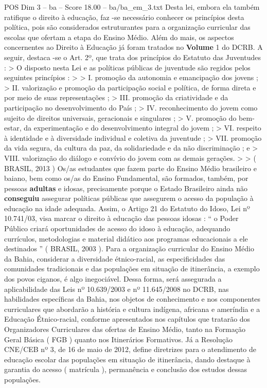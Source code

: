 \begin{textsample}{POS Dim 3 – ba – Score 18.00 – ba/ba\_em\_3.txt}
Desta lei, embora ela também ratifique o direito à educação, faz -se necessário conhecer os princípios desta política, pois são considerados estruturantes para a organização curricular das escolas que ofertam a etapa do Ensino Médio.
Além do mais, os aspectos concernentes ao Direito à Educação já foram tratados no \textbf{Volume} 1 do DCRB.
A seguir, destaca -se o Art. 2º, que trata dos princípios do Estatuto das Juventudes : > O disposto nesta Lei e as políticas públicas de juventude são regidos pelos seguintes princípios : > > I. promoção da autonomia e emancipação dos jovens ; > II. valorização e promoção da participação social e política, de forma direta e por meio de suas representações ; > III. promoção da criatividade e da participação no desenvolvimento do País ; > IV. reconhecimento do jovem como sujeito de direitos universais, geracionais e singulares ; > V. promoção do bem-estar, da experimentação e do desenvolvimento integral do jovem ; > VI. respeito à identidade e à diversidade individual e coletiva da juventude ; > VII. promoção da vida segura, da cultura da paz, da solidariedade e da não discriminação ; e > VIII. valorização do diálogo e convívio do jovem com as demais gerações. > > ( BRASIL, 2013 ) Os/as estudantes que fazem parte do Ensino Médio brasileiro e baiano, bem como os/as do Ensino Fundamental, são formados, também, por pessoas \textbf{adultas} e idosas, precisamente porque o Estado Brasileiro ainda não \textbf{conseguiu} assegurar políticas públicas que assegurem o acesso da população à educação na idade adequada.
Assim, o Artigo 21 do Estatuto do Idoso, Lei nº 10.741/03, visa marcar o direito à educação das pessoas idosas : “ o Poder Público criará oportunidades de acesso do idoso à educação, adequando currículos, metodologias e material didático aos programas educacionais a ele destinados ” ( BRASIL, 2003 ).
Para a organização curricular do Ensino Médio da Bahia, considerar a diversidade étnico-racial, as especificidades das comunidades tradicionais e das populações em situação de itinerância, a exemplo dos povos ciganos, é algo inegociável.
Dessa forma, será assegurada a aplicabilidade das Leis nº 10.639/2003 e nº 11.645/2008 no DCRB, nas habilidades específicas da Bahia, nos objetos de conhecimento e nos componentes curriculares que abordarão a história e cultura indígena, africana e ameríndia e a Educação Étnico-racial, conforme apresentados nos capítulos que tratarão dos Organizadores Curriculares das ofertas de Ensino Médio, tanto na Formação Geral Básica ( FGB ) quanto nos Itinerários Formativos.
Já a Resolução CNE/CEB nº 3, de 16 de maio de 2012, define diretrizes para o atendimento de educação escolar das populações em situação de itinerância, dando destaque à garantia do acesso ( matrícula ), permanência e conclusão dos estudos dessas populações.

\end{textsample}

